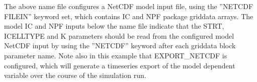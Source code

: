 


The above name file configures a NetCDF model input file, using the ”NETCDF FILEIN” keyword set, which contains IC and NPF package griddata arrays. The model IC and NPF inputs below the name file indicate that the STRT, ICELLTYPE and K parameters should be read from the configured model NetCDF input by using the ”NETCDF” keyword after each griddata block parameter name. Note also in this example that EXPORT\_NETCDF is configured, which will generate a timeseries export of the model dependent variable over the course of the simulation run.

